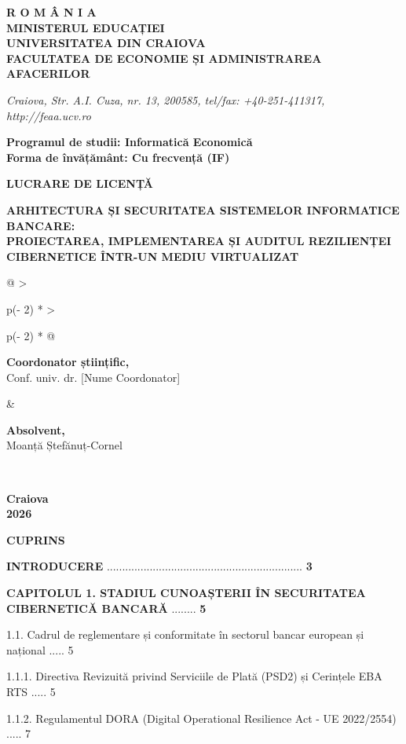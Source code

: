\documentclass[
]{article}
\author{}
\date{}
\begin{document}
\textbf{R O M Â N I A\\
MINISTERUL EDUCAȚIEI\\
UNIVERSITATEA DIN CRAIOVA\\
FACULTATEA DE ECONOMIE ȘI ADMINISTRAREA AFACERILOR}

\emph{Craiova, Str. A.I. Cuza, nr. 13, 200585, tel/fax: +40-251-411317,
http://feaa.ucv.ro}

\textbf{Programul de studii: Informatică Economică\\
Forma de învățământ: Cu frecvență (IF)}

\textbf{LUCRARE DE LICENȚĂ}

\textbf{ARHITECTURA ȘI SECURITATEA SISTEMELOR INFORMATICE BANCARE:\\
PROIECTAREA, IMPLEMENTAREA ȘI AUDITUL REZILIENȚEI CIBERNETICE ÎNTR-UN
MEDIU VIRTUALIZAT}

\begin{longtable}[]{@{}
  >{\raggedright\arraybackslash}p{(\columnwidth - 2\tabcolsep) * }
  >{\raggedright\arraybackslash}p{(\columnwidth - 2\tabcolsep) * }@{}}
\toprule\noalign{}
\begin{minipage}[b]{\linewidth}\raggedright
\textbf{Coordonator științific,\\
}Conf. univ. dr. {[}Nume Coordonator{]}\strut
\end{minipage} & \begin{minipage}[b]{\linewidth}\raggedright
\textbf{Absolvent,\\
}Moanță Ștefănuț-Cornel\strut
\end{minipage} \\
\midrule\noalign{}
\endhead
\bottomrule\noalign{}
\endlastfoot
\end{longtable}

\textbf{Craiova\\
2026}

\textbf{CUPRINS}

\textbf{INTRODUCERE}
................................................................
\textbf{3}

\textbf{CAPITOLUL 1. STADIUL CUNOAȘTERII ÎN SECURITATEA CIBERNETICĂ
BANCARĂ} ........ \textbf{5}

1.1. Cadrul de reglementare și conformitate în sectorul bancar european
și național ..... 5

1.1.1. Directiva Revizuită privind Serviciile de Plată (PSD2) și
Cerințele EBA RTS ..... 5

1.1.2. Regulamentul DORA (Digital Operational Resilience Act - UE
2022/2554) ..... 7
\end{document}
